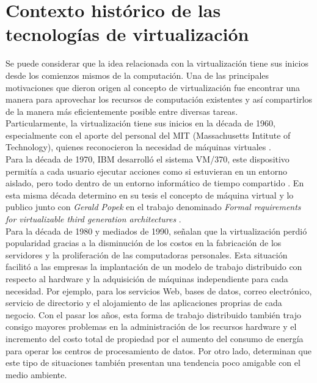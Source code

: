 \section{Contexto histórico de las tecnologías de virtualización} \label{historia}

Se puede considerar que la idea relacionada con la virtualización tiene sus inicios desde los comienzos mismos de la computación. Una de las principales motivaciones que dieron origen al concepto de virtualización fue encontrar una manera para aprovechar los recursos de computación existentes y así compartirlos de la manera más eficientemente posible entre diversas tareas. \\

Particularmente, la virtualización tiene sus inicios en la década de 1960, especialmente con el aporte del personal del MIT (Massachusetts Intitute of Technology), quienes reconocieron la necesidad de máquinas virtuales \parencite{ Varian1997, Ameen2013}.\\ 

Para la década de 1970, IBM desarrolló el sistema VM/370, este dispositivo permitía a cada usuario ejecutar acciones como si estuvieran en un entorno aislado, pero todo dentro de un entorno informático de tiempo compartido \parencite{Douglis2013, Varian1997}. En esta misma década \textcite{Goldberg1973} determino en su tesis el concepto de máquina virtual y lo publico junto con \textit{Gerald Popek} en el trabajo  denominado \textit{Formal requirements for virtualizable third generation architectures} \parencite{Popek1974}.\\


Para la década de 1980 y mediados de 1990, \textcite{Varasteh2017,Agrawal2013} señalan que la virtualización perdió popularidad gracias a la disminución de los costos en la fabricación de los servidores y la proliferación de las computadoras personales. Esta situación facilitó a las empresas la implantación de un modelo de trabajo distribuido con respecto al hardware y la  adquisición de máquinas independiente para cada necesidad. Por ejemplo, para los servicios Web, bases de datos, correo electrónico, servicio de directorio y el alojamiento de las aplicaciones proprias de cada negocio. Con el pasar los años, esta forma de trabajo distribuido también trajo consigo mayores problemas en la administración de los recursos hardware y el incremento del costo total de propiedad por el aumento del consumo de energía para operar los centros de procesamiento de datos. Por otro lado, \textcite{Ranjith2017} determinan que este tipo de situaciones también presentan una tendencia poco amigable con el medio ambiente. \\


